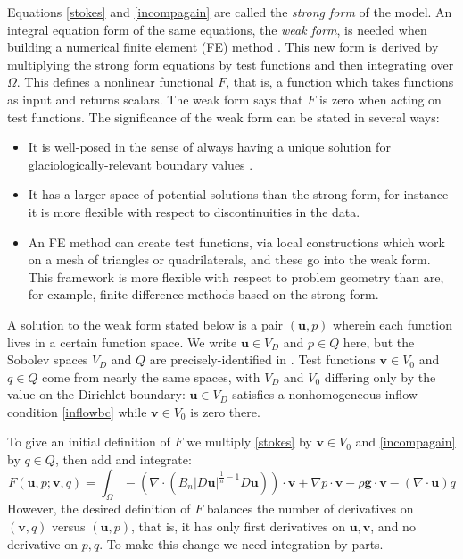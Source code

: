 \documentclass[letterpaper,final,12pt,reqno]{amsart}
\newcommand{\bu}{\mathbf{u}}
\newcommand{\bv}{\mathbf{v}}
\begin{document}
Equations \eqref{stokes} and \eqref{incompagain} are called the \emph{strong form} of the model.  An integral equation form of the same equations, the \emph{weak form}, is needed when building a numerical finite element (FE) method \cite{Elmanetal2014}.  This new form is derived by multiplying the strong form equations by test functions and then integrating over $\Omega$.  This defines a nonlinear functional $F$, that is, a function which takes functions as input and returns scalars.  The weak form says that $F$ is zero when acting on test functions.  The significance of the weak form can be stated in several ways:
\begin{itemize}
\item It is well-posed in the sense of always having a unique solution  for glaciologically-relevant boundary values \cite{JouvetRappaz2011}.
\item It has a larger space of potential solutions than the strong form, for instance it is more flexible with respect to discontinuities in the data.
\item An FE method can create test functions, via local constructions which work on a mesh of triangles or quadrilaterals, and these go into the weak form.  This framework is more flexible with respect to problem geometry than are, for example, finite difference methods based on the strong form.
\end{itemize}

A solution to the weak form stated below is a pair $(\bu,p)$ wherein each function lives in a certain function space.  We write $\bu\in V_D$ and $p \in Q$ here, but the Sobolev spaces $V_D$ and $Q$ are precisely-identified in \cite{JouvetRappaz2011}.  Test functions $\bv\in V_0$ and $q\in Q$ come from nearly the same spaces, with $V_D$ and $V_0$ differing only by the value on the Dirichlet boundary: $\bu\in V_D$ satisfies a nonhomogeneous inflow condition \eqref{inflowbc} while $\bv\in V_0$ is zero there.

To give an initial definition of $F$ we multiply \eqref{stokes} by $\bv\in V_0$ and \eqref{incompagain} by $q\in Q$, then add and integrate:
\begin{equation}
F(\bu,p;\bv,q) = \int_\Omega - \left(\nabla \cdot \left(B_n |D\bu|^{\frac{1}{n} - 1} D\bu\right)\right)\cdot \bv + \nabla p \cdot \bv - \rho \mathbf{g} \cdot \bv - \left(\nabla \cdot \bu\right) q \label{nonfuncone}
\end{equation}
However, the desired definition of $F$ balances the number of derivatives on $(\bv,q)$ versus $(\bu,p)$, that is, it has only first derivatives on $\bu,\bv$, and no derivative on $p,q$.  To make this change we need integration-by-parts.
\end{document}
